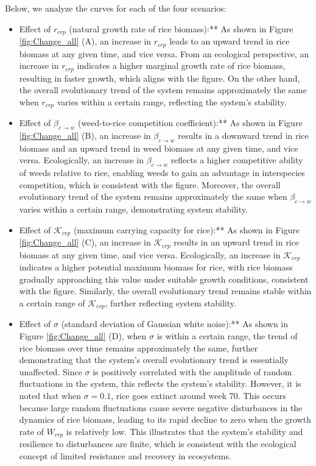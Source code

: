 \documentclass{HZNUMCM}
\begin{document}
    Below, we analyze the curves for each of the four scenarios:
    \begin{itemize}
      \item Effect of \( r_{crp} \) (natural growth rate of rice biomass):** 
      As shown in Figure \ref{fig:Change_all} (A), an increase in \( r_{crp} \) leads to an upward trend in rice biomass at any given time, and vice versa. 
      From an ecological perspective, an increase in \( r_{crp} \) indicates a higher marginal growth rate of rice biomass, resulting in faster growth, 
      which aligns with the figure. On the other hand, 
      the overall evolutionary trend of the system remains approximately the same when \( r_{crp} \) varies within a certain range, 
      reflecting the system's stability.
      \item Effect of \( \beta_{c\rightarrow w} \) (weed-to-rice competition coefficient):** As shown in Figure \ref{fig:Change_all} (B), 
      an increase in \( \beta_{c\rightarrow w} \) results in a downward trend in rice biomass and an upward trend in weed biomass at any given time, 
      and vice versa. Ecologically, an increase in \( \beta_{c\rightarrow w} \) reflects a higher competitive ability of weeds relative to rice, 
      enabling weeds to gain an advantage in interspecies competition, which is consistent with the figure. 
      Moreover, the overall evolutionary trend of the system remains approximately the same when \( \beta_{c\rightarrow w} \) varies within a certain range, 
      demonstrating system stability.
      \item Effect of \( \mathscr{K}_{crp} \) (maximum carrying capacity for rice):** As shown in Figure \ref{fig:Change_all} (C), 
      an increase in \( \mathscr{K}_{crp} \) results in an upward trend in rice biomass at any given time, and vice versa. 
      Ecologically, an increase in \( \mathscr{K}_{crp} \) indicates a higher potential maximum biomass for rice, 
      with rice biomass gradually approaching this value under suitable growth conditions, consistent with the figure. 
      Similarly, the overall evolutionary trend remains stable within a certain range of \( \mathscr{K}_{crp} \), further reflecting system stability.
      \item Effect of \( \sigma \) (standard deviation of Gaussian white noise):** As shown in Figure \ref{fig:Change_all} (D), 
      when \( \sigma \) is within a certain range, the trend of rice biomass over time remains approximately the same, 
      further demonstrating that the system's overall evolutionary trend is essentially unaffected. 
      Since \( \sigma \) is positively correlated with the amplitude of random fluctuations in the system, 
      this reflects the system's stability. However, it is noted that when \( \sigma = 0.1 \), rice goes extinct around week 70. 
      This occurs because large random fluctuations cause severe negative disturbances in the dynamics of rice biomass, 
      leading to its rapid decline to zero when the growth rate of \( W_{crp} \) is relatively low. 
      This illustrates that the system's stability and resilience to disturbances are finite, 
      which is consistent with the ecological concept of limited resistance and recovery in ecosystems.
    \end{itemize}
\end{document}
